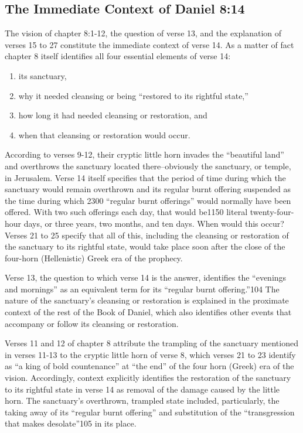 \subsection{The Immediate Context of Daniel 8:14}

The vision of chapter 8:1-12, the question of verse 13, and the explanation
of verses 15 to 27 constitute the immediate context of verse 14. As a matter
of fact chapter 8 itself identifies all four essential elements of verse 14:
\begin{enumerate}
	\item its sanctuary, 
	\item why it needed cleansing or being ``restored to its
rightful state,'' 
	\item how long it had needed cleansing or restoration, and
	\item when that cleansing or restoration would occur.
\end{enumerate}

According to verses 9-12, their cryptic little horn invades the ``beautiful
land'' and overthrows the sanctuary located there--obviously the sanctuary,
or temple, in Jerusalem. Verse 14 itself specifies that the period of time
during which the sanctuary would remain overthrown and its regular burnt
offering suspended as the time during which 2300 ``regular burnt offerings''
would normally have been offered. With two such offerings each day, that
would be1150 literal twenty-four-hour days, or three years, two months, and
ten days. When would this occur? Verses 21 to 25 specify that all of this,
including the cleansing or restoration of the sanctuary to its rightful
state, would take place soon after the close of the four-horn (Hellenistic)
Greek era of the prophecy.

Verse 13, the question to which verse 14 is the answer, identifies the
``evenings and mornings'' as an equivalent term for its ``regular burnt
offering.''104 The nature of the sanctuary's cleansing or restoration is
explained in the proximate context of the rest of the Book of Daniel, which
also identifies other events that accompany or follow its cleansing or
restoration.

Verses 11 and 12 of chapter 8 attribute the trampling of the sanctuary
mentioned in verses 11-13 to the cryptic little horn of verse 8, which
verses 21 to 23 identify as ``a king of bold countenance'' at ``the end'' of the
four horn (Greek) era of the vision. Accordingly, context explicitly
identifies the restoration of the sanctuary to its rightful state in verse
14 as removal of the damage caused by the little horn. The sanctuary's
overthrown, trampled state included, particularly, the taking away of its
``regular burnt offering'' and substitution of the ``transgression that makes
desolate''105 in its place.

